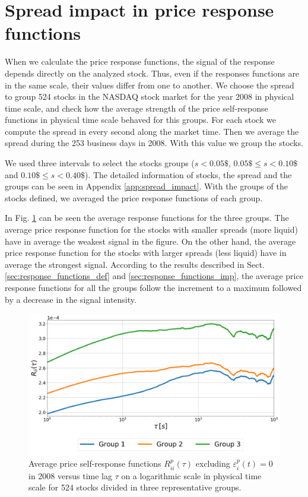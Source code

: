 \section{Spread impact in price response functions}\label{sec:spread_impact}

When we calculate the price response functions, the signal of the response
depends directly on the analyzed stock. Thus, even if the responses functions
are in the same scale, their values differ from one to another. We choose the
spread \cite{reg_and_irreg} to group 524 stocks in the NASDAQ stock market for
the year 2008 in physical time scale, and check how the average strength of the
price self-response functions in physical time scale behaved for this groups.
For each stock we compute the spread in every second along the market time.
Then we average the spread during the 253 business days in 2008. With this
value we group the stocks.

We used three intervals to select the stocks groups ($s<0.05\$$,
$0.05\$ \le s <0.10\$$ and $0.10\$ \le s <0.40\$$). The detailed information of
stocks, the spread and the groups can be seen in Appendix
\ref{app:spread_impact}. With the groups of the stocks defined, we averaged the
price response functions of each group.

In Fig. \ref{fig:spread_impact} can be seen the average response functions for
the three groups. The average price response function for the stocks with
smaller spreads (more liquid) have in average the weakest signal in the figure.
On the other hand, the average price response function for the stocks with
larger spreads (less liquid) have in average the strongest signal. According to
the results described in Sect. \ref{sec:response_functions_def} and
\ref{sec:response_functions_imp}, the average price response functions for all
the groups follow the increment to a maximum followed by a decrease in the
signal intensity.

\begin{figure}[htbp]
    \centering
    \includegraphics[width=\columnwidth]{figures/06_spread_impact_2008.png}
    \caption{Average price self-response functions
             $R^{p}_{ii}\left(\tau\right)$ excluding
             $\varepsilon^{p}_{i}\left(t\right) = 0$ in 2008 versus time lag
             $\tau$ on a logarithmic scale in physical time scale for 524
             stocks divided in three representative groups.}
    \label{fig:spread_impact}
\end{figure}

